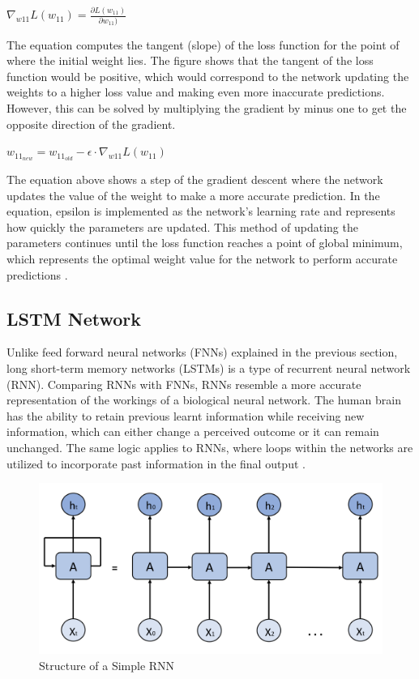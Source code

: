 \indent\newline
$\nabla_{w11} L(w_{11}) = \frac{\partial L(w_{11})}{\partial w_{11})}$

\indent\newline
The equation computes the tangent (slope) of the loss function for the point of where the initial weight lies. The figure shows that the tangent of the loss function would be positive, which would correspond to the network updating the weights to a higher loss value and making even more inaccurate predictions. However, this can be solved by multiplying the gradient by minus one to get the opposite direction of the gradient.  

\indent\newline
$w_{11_{new}} = w_{11_{old}} - \epsilon \cdot \nabla_{w11} L(w_{11})$

\indent\newline
The equation above shows a step of the gradient descent where the network updates the value of the weight to make a more accurate prediction. In the equation, epsilon is implemented as the network’s learning rate and represents how quickly the parameters are updated. This method of updating the parameters continues until the loss function reaches a point of global minimum, which represents the optimal weight value for the network to perform accurate predictions \cite{opper}.  

\subsection{LSTM Network}
Unlike feed forward neural networks (FNNs) explained in the previous section, long short-term memory networks (LSTMs) is a type of recurrent neural network (RNN). Comparing RNNs with FNNs, RNNs resemble a more accurate representation of the workings of a biological neural network. The human brain has the ability to retain previous learnt information while receiving new information, which can either change a perceived outcome or it can remain unchanged. The same logic applies to RNNs, where loops within the networks are utilized to incorporate past information in the final output \cite{adu}. 

\indent\newline 
\begin{figure}[H]
\centering
\includegraphics [scale=0.32,angle=360]{figures/rnn.png}
\caption{Structure of a Simple RNN}
\label{fig:rnn}
\end{figure}

